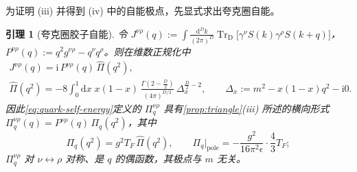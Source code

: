 \documentclass[UTF8,a4paper,11pt,fontset=fandol]{ctexart}
\theoremstyle{cplain}
\newtheorem{lemma}[theorem]{引理}
\theoremstyle{cdefinition}
\theoremstyle{cremark}
\numberwithin{equation}{section}
\newcommand{\TrD}{\operatorname{Tr}_{\mathrm{D}}}   %
\newcommand{\dd}{\mathrm{d}}                         %
\newcommand{\ii}{\mathrm{i}}                        %
\begin{document}
为证明 (iii) 并得到 (iv) 中的自能极点，先显式求出夸克圈自能。

\begin{lemma}[夸克圈胶子自能]\label{lem:tri-selfenergy}
令 $J^{\nu\rho}(q):=\int\frac{\dd^Dk}{(2\pi)^D}\TrD\bigl[\gamma^\nu S(k)\gamma^\rho S(k+q)\bigr]$，$P^{\nu\rho}(q):=q^2g^{\nu\rho}-q^\nu q^\rho$。则在维数正规化中
\begin{equation}\label{eq:tri-J}
\begin{gathered}
J^{\nu\rho}(q)=\ii\,P^{\nu\rho}(q)\,\hat\Pi(q^2),\\
\hat\Pi(q^2)=-8\int_0^1\dd x\;x(1-x)\,\frac{\Gamma(2-\frac D2)}{(4\pi)^{D/2}}\,\Delta_x^{\frac D2-2},\qquad \Delta_x:=m^2-x(1-x)q^2-\ii0 .
\end{gathered}
\end{equation}
因此\cref{eq:quark-self-energy}定义的 $\Pi_q^{\nu\rho}$ 具有\cref{prop:triangle}(iii) 所述的横向形式 $\Pi_q^{\nu\rho}(q)=P^{\nu\rho}(q)\,\Pi_q(q^2)$，其中
\begin{equation}\label{eq:tri-Pi}
\Pi_q(q^2)=g^2T_F\,\hat\Pi(q^2),\qquad \Pi_q\big|_{\mathrm{pole}}=-\frac{g^2}{16\pi^2\epsilon}\cdot\frac43T_F ;
\end{equation}
$\Pi_q^{\nu\rho}$ 对 $\nu\leftrightarrow\rho$ 对称、是 $q$ 的偶函数，其极点与 $m$ 无关。
\end{lemma}
\end{document}
